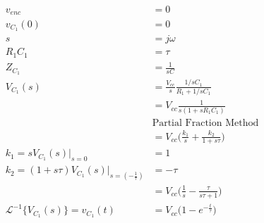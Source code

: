 \documentclass{article}
\begin{document}
\begin{align*}
  v_{enc} &= 0\\
  v_{C_1}(0) &= 0\\
  s &= j \omega\\
  R_1C_1 &= \tau\\
  Z_{C_1}&= \frac{1}{sC}\\
  V_{C_1}(s) &= \frac{V_{cc}}{s}\frac{1/sC_1}{R_1+1/sC_1}\\
  &= V_{cc}\frac{1}{s(1+sR_1C_1)}\\
  &\text{Partial Fraction Method}\\
  &= V_{cc}\bigg( \frac{k_1}{s}+\frac{k_2}{1+s\tau}\bigg)\\
  k_1 = sV_{C_1}(s)|_{s=0} &= 1\\
  k_2 = (1+s\tau)V_{C_1}(s)|_{s=(-\frac{1}{\tau})} &= -\tau\\
  &= V_{cc}\bigg(\frac{1}{s}-\frac{\tau}{s \tau + 1} \bigg)\\
  \mathcal{L}^{-1}\{
    V_{C_1}(s)\}=v_{C_1}(t)&=V_{cc}\bigg(1-e^{-\frac{t}{\tau}}\bigg)
\end{align*}
\end{document}
